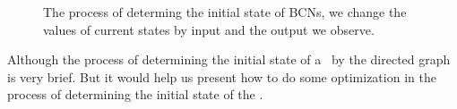 \begin{figure}[thpb]
      \centering
      
      \caption{The process of determing the initial state of BCNs, we change the values of current states by input and the output we observe. }
      \label{fig:5}
   \end{figure}

Although the process of determining the initial state of a \BCN\ by the directed graph is very brief. But it would help us present how to do some optimization in the process of determining the initial state of the \BCNs.

